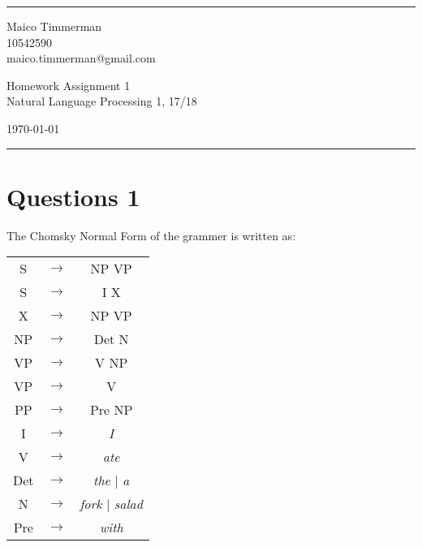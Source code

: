 \documentclass[a4paper]{article}
\begin{document}

\fancyhead[C]{}
\hrule \medskip %
\begin{minipage}{0.295\textwidth}
    \raggedright
    \footnotesize
    Maico Timmerman \hfill\\
    10542590\hfill\\
    maico.timmerman@gmail.com
\end{minipage}
\begin{minipage}{0.4\textwidth}
    \centering
    \large
    Homework Assignment 1\\
    \normalsize
    Natural Language Processing 1, 17/18\\
\end{minipage}
\begin{minipage}{0.295\textwidth}
    \raggedleft
    \today\hfill\\
\end{minipage}
\medskip\hrule
\bigskip


\section*{Questions 1}
The  Chomsky Normal Form of the grammer is written as:

    \begin{table}[h]
        \centering
        \begin{tabular}{ccc}
            S &$\rightarrow$& NP VP\\
            S &$\rightarrow$& I X\\
            X &$\rightarrow$& NP VP\\
            NP &$\rightarrow$& Det N\\
            VP &$\rightarrow$& V NP\\
            VP &$\rightarrow$& V\\
            PP &$\rightarrow$& Pre NP\\
            I &$\rightarrow$& \textit{I}\\
            V &$\rightarrow$& \textit{ate}\\
            Det &$\rightarrow$& \textit{the} | \textit{a}\\
            N &$\rightarrow$& \textit{fork} | \textit{salad}\\
            Pre &$\rightarrow$& \textit{with}
        \end{tabular}
    \end{table}
\end{document}

